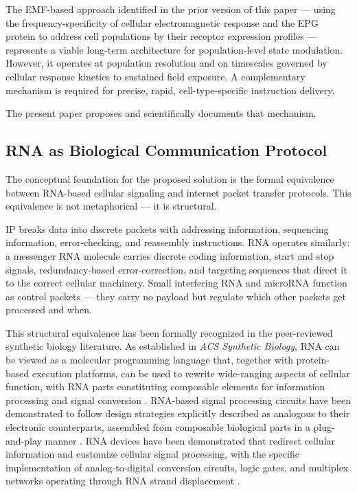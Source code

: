 \documentclass[12pt]{article}
\begin{document}
The EMF-based approach identified in the prior version of this paper --- using the frequency-specificity of cellular electromagnetic response and the EPG protein to address cell populations by their receptor expression profiles --- represents a viable long-term architecture for population-level state modulation. However, it operates at population resolution and on timescales governed by cellular response kinetics to sustained field exposure. A complementary mechanism is required for precise, rapid, cell-type-specific instruction delivery.

The present paper proposes and scientifically documents that mechanism.

\subsection{RNA as Biological Communication Protocol}

The conceptual foundation for the proposed solution is the formal equivalence between RNA-based cellular signaling and internet packet transfer protocols. This equivalence is not metaphorical --- it is structural.

IP breaks data into discrete packets with addressing information, sequencing information, error-checking, and reassembly instructions. RNA operates similarly: a messenger RNA molecule carries discrete coding information, start and stop signals, redundancy-based error-correction, and targeting sequences that direct it to the correct cellular machinery. Small interfering RNA and microRNA function as control packets --- they carry no payload but regulate which other packets get processed and when.

This structural equivalence has been formally recognized in the peer-reviewed synthetic biology literature. As established in \textit{ACS Synthetic Biology}, RNA can be viewed as a molecular programming language that, together with protein-based execution platforms, can be used to rewrite wide-ranging aspects of cellular function, with RNA parts constituting composable elements for information processing and signal conversion \cite{rna_programming_2016}. RNA-based signal processing circuits have been demonstrated to follow design strategies explicitly described as analogous to their electronic counterparts, assembled from composable biological parts in a plug-and-play manner \cite{customizing_signal_2023}. RNA devices have been demonstrated that redirect cellular information and customize cellular signal processing, with the specific implementation of analog-to-digital conversion circuits, logic gates, and multiplex networks operating through RNA strand displacement \cite{dynamic_rna_2024}.
\end{document}
